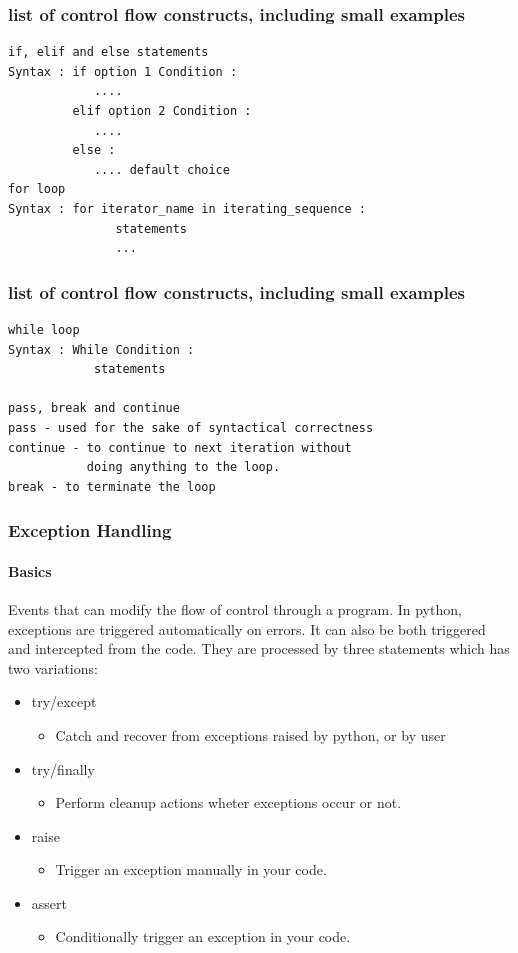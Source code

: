 \documentclass{beamer}
\begin{document}
\begin{frame}[fragile] %
\frametitle{list of control flow constructs, including small examples}
\begin{example}
\begin{verbatim}
if, elif and else statements
Syntax : if option 1 Condition :
            ....
         elif option 2 Condition :
            ....
         else :
            .... default choice   
for loop
Syntax : for iterator_name in iterating_sequence :
               statements
               ...
\end{verbatim}
\end{example}  
\end{frame}  
          
\begin{frame}[fragile] %
\frametitle{list of control flow constructs, including small examples}
\begin{example}
\begin{verbatim}
while loop
Syntax : While Condition :
            statements 

pass, break and continue
pass - used for the sake of syntactical correctness
continue - to continue to next iteration without 
           doing anything to the loop.
break - to terminate the loop

\end{verbatim}
\end{example}
\end{frame}

\begin{frame}
\frametitle{Exception Handling}
\framesubtitle{Basics}
Events that can modify the flow of control through a program.
In python, exceptions are triggered automatically on errors. It can also be both triggered and intercepted from the code. They are processed by three statements which has two variations:
\begin{itemize}
\item try/except
	\begin{itemize}
	\item Catch and recover from exceptions raised by python, or by user
	\end{itemize}
\item try/finally
	\begin{itemize}
	\item Perform cleanup actions wheter exceptions occur or not.
	\end{itemize}
\item raise
	\begin{itemize}
	\item Trigger an exception manually in your code.
	\end{itemize}
\item assert
	\begin{itemize}
	\item Conditionally trigger an exception in your code.
	\end{itemize}
\end{itemize}
  
\end{frame}
\end{document}
